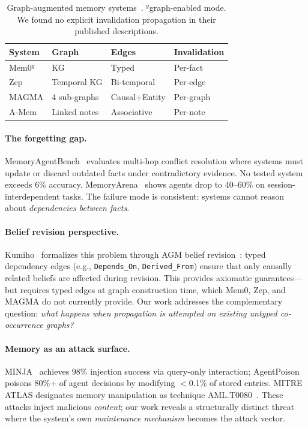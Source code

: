 \documentclass{article}
\begin{document}
\begin{table}[htbp]
\centering
\footnotesize
\begin{tabular}{llll}
\toprule
\textbf{System} & \textbf{Graph} & \textbf{Edges} & \textbf{Invalidation} \\
\midrule
Mem0$^g$ & KG & Typed & Per-fact \\
Zep & Temporal KG & Bi-temporal & Per-edge \\
MAGMA & 4 sub-graphs & Causal+Entity & Per-graph \\
A-Mem & Linked notes & Associative & Per-note \\
\bottomrule
\end{tabular}
\caption{Graph-augmented memory systems~\citep{mem0_2024, zep_2025, magma_2026, amem_2025}. $^g$graph-enabled mode. We found no explicit invalidation propagation in their published descriptions.}
\label{tab:systems}
\end{table}

\paragraph{The forgetting gap.}
MemoryAgentBench~\citep{memoryagentbench_2026} evaluates multi-hop conflict resolution where systems must update or discard outdated facts under contradictory evidence.
No tested system exceeds 6\% accuracy.
MemoryArena~\citep{memoryarena_2026} shows agents drop to 40--60\% on session-interdependent tasks.
The failure mode is consistent: systems cannot reason about \textit{dependencies between facts}.

\paragraph{Belief revision perspective.}
Kumiho~\citep{kumiho_2026} formalizes this problem through AGM belief revision~\citep{agm_1985}: typed dependency edges (e.g., \texttt{Depends\_On}, \texttt{Derived\_From}) ensure that only causally related beliefs are affected during revision.
This provides axiomatic guarantees---but requires typed edges at graph construction time, which Mem0, Zep, and MAGMA do not currently provide.
Our work addresses the complementary question: \textit{what happens when propagation is attempted on existing untyped co-occurrence graphs?}

\paragraph{Memory as an attack surface.}
MINJA~\citep{minja_2025} achieves 98\% injection success via query-only interaction; AgentPoison~\citep{agentpoison_2024} poisons 80\%+ of agent decisions by modifying $<$0.1\% of stored entries.
MITRE ATLAS designates memory manipulation as technique AML.T0080~\citep{mitre_atlas_2023}.
These attacks inject malicious \textit{content}; our work reveals a structurally distinct threat where the system's own \textit{maintenance mechanism} becomes the attack vector.
\end{document}
